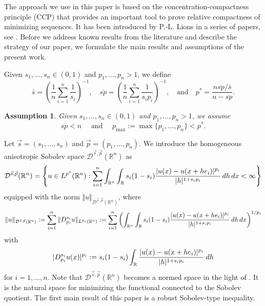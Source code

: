 \documentclass[11pt]{amsart}
\theoremstyle{plain}
\newtheorem{assumption}{Assumption}
\theoremstyle{definition}
\numberwithin{equation}{section}
\renewcommand{\d}{\textnormal{d}}
\newcommand{\R}{\mathbb{R}}
\newcommand{\Dsp}{\mathcal{D}^{\vec{s},\vec{p}}(\mathbb{R}^n)}
\begin{document}
The approach we use in this paper is based on the concentration-compactness principle (CCP) that provides an important tool to prove relative compactness of minimizing sequences. It has been introduced by P.-L. Lions in a series of papers, see \cite{Lions1,Lions2,Lions3,Lions4}.  
Before we address known results from the literature and describe the strategy of our paper, we formulate the main results and assumptions of the present work.

Given $s_1,\dots,s_n\in(0,1)$ and $p_1,\dots,p_n>1$, we define
\begin{equation*}
\bar{s} = \left( \frac{1}{n} \sum_{i=1}^n \frac{1}{s_i} \right)^{-1}, \quad \overline{sp}=\left( \frac{1}{n} \sum_{i=1}^n \frac{1}{s_i p_i} \right)^{-1}, \quad\text{and}\quad p^{\ast} = \frac{n\overline{sp}/\bar{s}}{n-\overline{sp}}.
\end{equation*}
\begin{assumption}\label{assumption:sp}
Given $s_1,\dots,s_n\in(0,1)$ and $p_1,\dots,p_n>1$, we assume
\[ \overline{sp} < n\quad \text{ and } \quad  p_{\max} := \max\lbrace p_1, \dots, p_n \rbrace < p^{\ast}. \]
\end{assumption}
Let $\vec{s}=(s_1,\dots,s_n)$ and $\vec{p}=(p_1,\dots,p_n)$. 
We introduce the homogeneous anisotropic Sobolev space $\mathcal{D}^{\vec{s}, \vec{p}}(\mathbb{R}^n)$ as
\begin{equation*}
\mathcal{D}^{\vec{s}, \vec{p}}(\mathbb{R}^n) = \left\lbrace u \in L^{p^\ast}(\mathbb{R}^n): \sum_{i=1}^n \int_{\mathbb{R}^n} \int_{\mathbb{R}} s_i(1-s_i) \frac{|u(x)-u(x+he_i)|^{p_i}}{|h|^{1+s_i p_i}} \,\d h \,\d x < \infty \right\rbrace
\end{equation*}
equipped with the norm $\Vert u \Vert_{\Dsp}$, where
\begin{equation*}
\Vert u \Vert_{\Dsp} := \sum_{i=1}^n \Vert D^{s_i}_{p_i} u \Vert_{L^{p_i}(\R^n)} := \sum_{i=1}^n \left( \int_{\mathbb{R}^n} \int_{\mathbb{R}} s_i(1-s_i) \frac{|u(x)-u(x+he_i)|^{p_i}}{|h|^{1+s_i p_i}} \,\d h\, \d x \right)^{1/p_i}
\end{equation*}
with
\begin{equation*}
|D^{s_i}_{p_i} u(x)|^{p_i} := s_i(1-s_i) \int_{\mathbb{R}} \frac{|u(x)-u(x+he_i)|^{p_i}}{|h|^{1+s_i p_i}} \,\d h
\end{equation*}
for $i=1,\dots,n$. Note that $\Dsp$ becomes a normed space in the light of . It is the natural space for minimizing the functional connected to the Sobolev quotient. The first main result of this paper is a robust Sobolev-type inequality.
\end{document}
